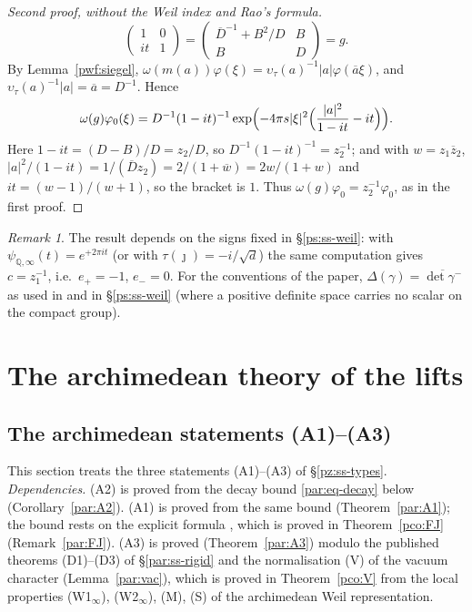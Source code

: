 \documentclass[10pt]{amsart}
\theoremstyle{definition}
\theoremstyle{remark}
\newtheorem{remark}[theorem]{Remark}
\newcommand{\Q}{\mathbb Q}
\providecommand{\auPl}{\Phi}
\providecommand{\auU}{\mathrm U}
\providecommand{\aubar}[1]{\overline{#1}}
\begin{document}
\begin{proof}[Second proof, without the Weil index and Rao's formula]
\[\begin{pmatrix}1&0\\it&1\end{pmatrix}=\begin{pmatrix}\aubar D^{-1}+B^2/D&B\\B&D\end{pmatrix}=g .
\]
By Lemma~\ref{pwf:siegel}, $\omega(m(a))\varphi(\xi)=\upsilon_\tau(a)^{-1}|a|\varphi(\aubar a\xi)$, and
$\upsilon_\tau(a)^{-1}|a|=\aubar a=D^{-1}$. Hence
\[
\omega(g)\varphi_0(\xi)=D^{-1}(1-it)^{-1}\exp\Bigl(-4\pi s|\xi|^2\Bigl(\frac{|a|^2}{1-it}-it\Bigr)\Bigr).
\]
Here $1-it=(D-B)/D=z_2/D$, so $D^{-1}(1-it)^{-1}=z_2^{-1}$; and with $w=z_1\aubar z_2$,
$|a|^2/(1-it)=1/(\aubar Dz_2)=2/(1+\aubar w)=2w/(1+w)$ and $it=(w-1)/(w+1)$, so the bracket is $1$.
Thus $\omega(g)\varphi_0=z_2^{-1}\varphi_0$, as in the first proof.
\end{proof}

\begin{remark}\label{pwf:delta-open}
The result depends on the signs fixed in \S\ref{ps:ss-weil}: with $\psi_{\Q,\infty}(t)=e^{+2\pi it}$
(or with $\tau(\jmath)=-i/\sqrt d$) the same computation gives $c=z_1^{-1}$, i.e.\ $e_+=-1$, $e_-=0$.
For the conventions of the paper, $\Delta(\gamma)=\aubar{\det\gamma^-}$ as used in {\cite[\S3.3.2]{P54}}
and in \S\ref{ps:ss-weil} (where a positive definite space carries no scalar on the compact group).
\end{remark}



\section{The archimedean theory of the lifts}\label{A1:g2}
\providecommand{\auU}{\mathrm U}
\providecommand{\auPl}{\Phi}
\providecommand{\auHom}{\operatorname{Hom}}
\providecommand{\psrho}{\varrho}
\providecommand{\pzF}{\mathfrak F}
\providecommand{\parsgn}{\operatorname{sgn}}

\subsection{The archimedean statements (A1)--(A3)}\label{par:sec}

This section treats the three statements (A1)--(A3) of \S\ref{pz:ss-types}. \emph{Dependencies.}
(A2) is proved from the decay bound \eqref{par:eq-decay} below (Corollary~\ref{par:A2}). (A1) is
proved from the same bound (Theorem~\ref{par:A1}); the bound rests on the explicit formula
{\cite[(59)]{P51}}, which is proved in Theorem~\ref{pco:FJ} (Remark~\ref{par:FJ}). (A3) is proved
(Theorem~\ref{par:A3}) modulo the published theorems (D1)--(D3) of \S\ref{par:ss-rigid} and the
normalisation (V) of the vacuum character (Lemma~\ref{par:vac}), which is proved in
Theorem~\ref{pco:V} from the local properties (W1$_\infty$), (W2$_\infty$), (M), (S) of the
archimedean Weil representation.
\end{document}
